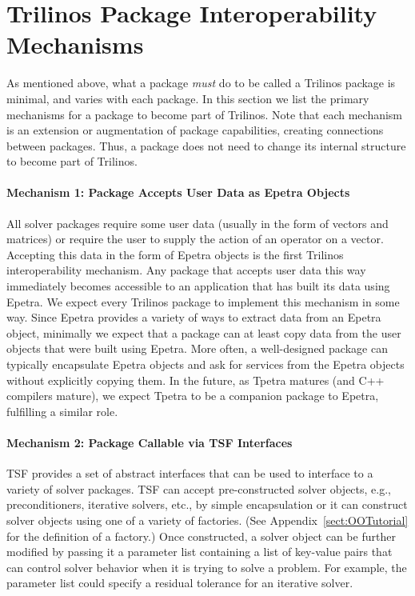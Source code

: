 \documentclass[12pt,relax]{TrilinosOverview}
\begin{document}
\section{Trilinos Package Interoperability Mechanisms}
\label{sect:PackageDefinition}
As mentioned above, what a package {\it must} do to be called a Trilinos
package is minimal, and varies with each package.  In this section we
list the primary mechanisms for a package to become part of Trilinos.
Note that each mechanism is an extension or augmentation of package
capabilities, creating connections between packages.  Thus, a package does 
not need to change its internal structure to become part of Trilinos.

\paragraph{Mechanism 1: Package Accepts User Data as Epetra Objects}
All solver packages require some user data (usually in the form of
vectors and matrices) or require the user to supply the action of an
operator on a vector.  Accepting this data in the form of Epetra
objects is the first Trilinos interoperability mechanism.  Any package
that accepts user data this way immediately becomes accessible to an
application that has built its data using Epetra.  We expect every
Trilinos package to implement this mechanism in some way.  Since
Epetra provides a variety of ways to extract data from an Epetra
object, minimally we expect that a package can at least copy data from
the user objects that were built using Epetra.  More often, a well-designed
package can typically encapsulate Epetra objects and ask for services from
the Epetra objects without explicitly copying them.  In the future, as
Tpetra matures (and C++ compilers mature), we expect Tpetra to be a
companion package to Epetra, fulfilling a similar role.

\paragraph{Mechanism 2: Package Callable via TSF Interfaces}
TSF provides a set of abstract interfaces that can be used to
interface to a variety of solver packages.  TSF can accept
pre-constructed solver objects, e.g., preconditioners, iterative
solvers, etc., by simple encapsulation or it can
construct solver objects using one of a variety of factories.  (See
Appendix~\ref{sect:OOTutorial} for the definition of a factory.)  Once
constructed, a solver object can be further modified by passing it a
parameter list containing a list of key-value pairs that can control
solver behavior when it is trying to solve a problem.  For example,
the parameter list could specify a residual tolerance for an iterative solver.
\end{document}
